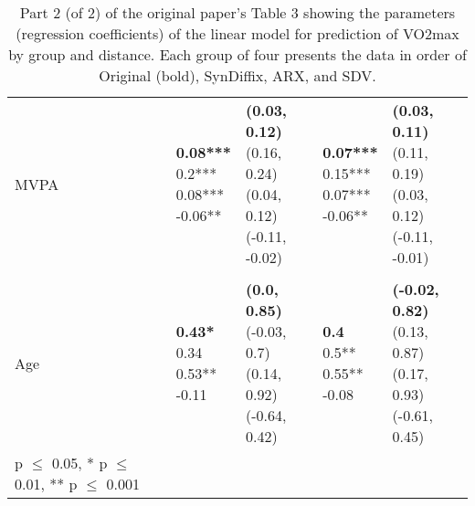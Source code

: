\begin{table}
\begin{center}
\begin{small}
\begin{tabular}{lllll}
\quad MVPA    &  \makecell[l]{\textbf{0.08***} \\0.2*** \\0.08*** \\-0.06** \\}   &  \makecell[l]{\textbf{(0.03, 0.12)} \\(0.16, 0.24) \\(0.04, 0.12) \\(-0.11, -0.02) \\}   &  \makecell[l]{\textbf{0.07***} \\0.15*** \\0.07*** \\-0.06** \\}   &  \makecell[l]{\textbf{(0.03, 0.11)} \\(0.11, 0.19) \\(0.03, 0.12) \\(-0.11, -0.01) \\} \\ 
& & & & \\ 
\quad Age    &  \makecell[l]{\textbf{0.43*} \\0.34 \\0.53** \\-0.11 \\}   &  \makecell[l]{\textbf{(0.0, 0.85)} \\(-0.03, 0.7) \\(0.14, 0.92) \\(-0.64, 0.42) \\}   &  \makecell[l]{\textbf{0.4} \\0.5** \\0.55** \\-0.08 \\}   &  \makecell[l]{\textbf{(-0.02, 0.82)} \\(0.13, 0.87) \\(0.17, 0.93) \\(-0.61, 0.45) \\} \\ 

      \bottomrule
      {\footnotesize * p $\leq$ 0.05, \quad** p $\leq$ 0.01, \quad*** p $\leq$ 0.001}
      \end{tabular}
      \end{small}
      \caption{Part 2 (of 2) of the original paper's Table 3 showing the parameters (regression coefficients) of the linear model for prediction of VO2max by group and distance. Each group of four presents the data in order of Original (bold), SynDiffix, ARX, and SDV. 
      }
      \label{tab:table3b}
      \end{center}
      \end{table}
    